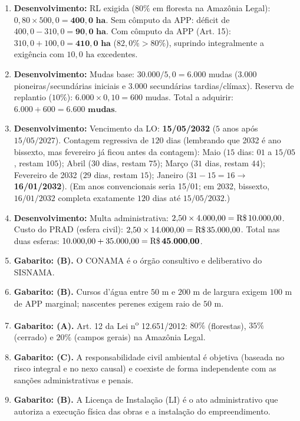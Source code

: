 \begin{boxGabarito}
\begin{enumerate}[leftmargin=1.6em, itemsep=4pt]
  APP total: $4{,}80 + 1{,}57 = \mathbf{6{,}37\text{ ha}}$.
  Reserva Legal mínima na Bahia ($20\%$): $A_{\text{RL}} = 0{,}20 \times 180{,}0 = \mathbf{36{,}00\text{ ha}}$.
  \item \textbf{Desenvolvimento:}
  RL exigida ($80\%$ em floresta na Amazônia Legal): $0{,}80 \times 500{,}0 = \mathbf{400{,}0\text{ ha}}$.
  Sem cômputo da APP: déficit de $400{,}0 - 310{,}0 = \mathbf{90{,}0\text{ ha}}$.
  Com cômputo da APP (Art. 15): $310{,}0 + 100{,}0 = \mathbf{410{,}0\text{ ha}}$ ($82{,}0\% > 80\%$), suprindo integralmente a exigência com $10{,}0\text{ ha}$ excedentes.
  \item \textbf{Desenvolvimento:}
  Mudas base: $30.000 / 5{,}0 = 6.000$ mudas ($3.000$ pioneiras/secundárias iniciais e $3.000$ secundárias tardias/clímax).
  Reserva de replantio ($10\%$): $6.000 \times 0{,}10 = 600$ mudas.
  Total a adquirir: $6.000 + 600 = \mathbf{6.600\text{ mudas}}$.
  \item \textbf{Desenvolvimento:}
  Vencimento da LO: \textbf{15/05/2032} ($5$ anos após $15/05/2027$).
  Contagem regressiva de $120$ dias (lembrando que 2032 é ano bissexto, mas fevereiro já ficou antes da contagem):
  Maio ($15$ dias: $01$ a $15/05$, restam $105$); Abril ($30$ dias, restam $75$); Março ($31$ dias, restam $44$); Fevereiro de 2032 ($29$ dias, restam $15$); Janeiro ($31 - 15 = 16 \rightarrow$ \textbf{16/01/2032}). (Em anos convencionais seria 15/01; em 2032, bissexto, $16/01/2032$ completa exatamente $120$ dias até $15/05/2032$.)
  \item \textbf{Desenvolvimento:}
  Multa administrativa: $2{,}50 \times 4.000{,}00 = \text{R\$\,}{10.000{,}00}$.
  Custo do PRAD (esfera civil): $2{,}50 \times 14.000{,}00 = \text{R\$\,}{35.000{,}00}$.
  Total nas duas esferas: $10.000{,}00 + 35.000{,}00 = \mathbf{\text{R\$\,}{45.000{,}00}}$.
  \item \textbf{Gabarito: (B).} O CONAMA é o órgão consultivo e deliberativo do SISNAMA.
  \item \textbf{Gabarito: (B).} Cursos d'água entre $50\text{ m}$ e $200\text{ m}$ de largura exigem $100\text{ m}$ de APP marginal; nascentes perenes exigem raio de $50\text{ m}$.
  \item \textbf{Gabarito: (A).} Art. 12 da Lei n\textsuperscript{o} 12.651/2012: $80\%$ (florestas), $35\%$ (cerrado) e $20\%$ (campos gerais) na Amazônia Legal.
  \item \textbf{Gabarito: (C).} A responsabilidade civil ambiental é objetiva (baseada no risco integral e no nexo causal) e coexiste de forma independente com as sanções administrativas e penais.
  \item \textbf{Gabarito: (B).} A Licença de Instalação (LI) é o ato administrativo que autoriza a execução física das obras e a instalação do empreendimento.
\end{enumerate}
\end{boxGabarito}

